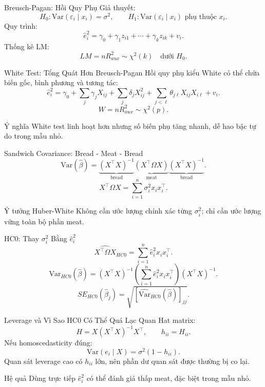 \documentclass[aspectratio=169,professionalfonts]{beamer}
\newcommand{\mathnote}[1]{%
  \begin{block}{Ý nghĩa}
    #1
  \end{block}
}
\begin{document}
\begin{frame}{Breusch-Pagan: Hồi Quy Phụ}
  \small
  Giả thuyết:
  \[
    H_0:\mathrm{Var}(\varepsilon_i\mid x_i)=\sigma^2,
    \qquad
    H_1:\mathrm{Var}(\varepsilon_i\mid x_i) \text{ phụ thuộc } x_i.
  \]
  Quy trình:
  \[
    \hat e_i^2 = \gamma_0 + \gamma_1 z_{i1}+\cdots+\gamma_k z_{ik}+v_i.
  \]
  Thống kê LM:
  \[
    LM=nR^2_{aux}\sim\chi^2(k) \quad \text{dưới }H_0.
  \]
\end{frame}

\begin{frame}{White Test: Tổng Quát Hơn Breusch-Pagan}
  \small
  Hồi quy phụ kiểu White có thể chứa biến gốc, bình phương và tương tác:
  \[
    \hat e_i^2
    =
    \gamma_0+\sum_j\gamma_jX_{ij}
    +\sum_j\delta_jX_{ij}^2
    +\sum_{j<\ell}\theta_{j\ell}X_{ij}X_{i\ell}+v_i.
  \]
  \[
    W=nR^2_{aux}\sim\chi^2(p).
  \]
  \mathnote{White test linh hoạt hơn nhưng số biến phụ tăng nhanh, dễ hao bậc tự do trong mẫu nhỏ.}
\end{frame}

\begin{frame}{Sandwich Covariance: Bread - Meat - Bread}
  \small
  \[
    \mathrm{Var}(\hat\beta)
    =
    \underbrace{(X^{\top}X)^{-1}}_{\text{bread}}
    \underbrace{(X^{\top}\Omega X)}_{\text{meat}}
    \underbrace{(X^{\top}X)^{-1}}_{\text{bread}}.
  \]
  \[
    X^{\top}\Omega X
    =
    \sum_{i=1}^{n}\sigma_i^2x_ix_i^{\top}.
  \]
  \begin{block}{Ý tưởng Huber-White}
    Không cần ước lượng chính xác từng $\sigma_i^2$; chỉ cần ước lượng vững toàn bộ phần meat.
  \end{block}
\end{frame}

\begin{frame}{HC0: Thay \texorpdfstring{$\sigma_i^2$}{sigmai2} Bằng \texorpdfstring{$\hat e_i^2$}{ei2}}
  \small
  \[
    \widehat{X^{\top}\Omega X}_{HC0}
    =
    \sum_{i=1}^{n}\hat e_i^2x_ix_i^{\top}.
  \]
  \[
    \widehat{\mathrm{Var}}_{HC0}(\hat\beta)
    =
    (X^{\top}X)^{-1}
    \left(\sum_{i=1}^{n}\hat e_i^2x_ix_i^{\top}\right)
    (X^{\top}X)^{-1}.
  \]
  \[
    SE_{HC0}(\hat\beta_j)
    =
    \sqrt{\left[\widehat{\mathrm{Var}}_{HC0}(\hat\beta)\right]_{jj}}.
  \]
\end{frame}

\begin{frame}{Leverage và Vì Sao HC0 Có Thể Quá Lạc Quan}
  \small
  Hat matrix:
  \[
    H=X(X^{\top}X)^{-1}X^{\top},\qquad h_{ii}=H_{ii}.
  \]
  Nếu homoscedasticity đúng:
  \[
    \mathrm{Var}(e_i\mid X)=\sigma^2(1-h_{ii}).
  \]
  Quan sát leverage cao có $h_{ii}$ lớn, nên phần dư quan sát được thường bị co lại.
  \begin{block}{Hệ quả}
    Dùng trực tiếp $\hat e_i^2$ có thể đánh giá thấp meat, đặc biệt trong mẫu nhỏ.
  \end{block}
\end{frame}
\end{document}
